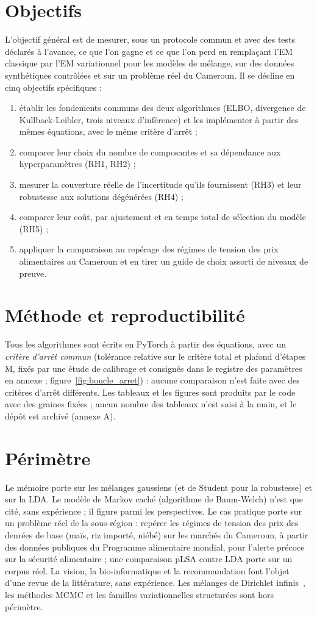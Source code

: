 \section*{Objectifs}
L'objectif général est de mesurer, sous un protocole commun et avec des tests déclarés à l'avance, ce que l'on gagne et ce que l'on perd en remplaçant l'EM classique par l'EM variationnel pour les modèles de mélange, sur des données synthétiques contrôlées et sur un problème réel du Cameroun. Il se décline en cinq objectifs spécifiques :
\begin{enumerate}
\item établir les fondements communs des deux algorithmes (ELBO, divergence de Kullback-Leibler, trois niveaux d'inférence) et les implémenter à partir des mêmes équations, avec le même critère d'arrêt ;
\item comparer leur choix du nombre de composantes et sa dépendance aux hyperparamètres (RH1, RH2) ;
\item mesurer la couverture réelle de l'incertitude qu'ils fournissent (RH3) et leur robustesse aux solutions dégénérées (RH4) ;
\item comparer leur coût, par ajustement et en temps total de sélection du modèle (RH5) ;
\item appliquer la comparaison au repérage des régimes de tension des prix alimentaires au Cameroun et en tirer un guide de choix assorti de niveaux de preuve.
\end{enumerate}

\section*{Méthode et reproductibilité}
Tous les algorithmes sont écrits en PyTorch à partir des équations, avec un \emph{critère d'arrêt commun} (tolérance relative sur le critère total et plafond d'étapes M, fixés par une étude de calibrage et consignés dans le registre des paramètres en annexe ; figure~\ref{fig:boucle_arret}) : aucune comparaison n'est faite avec des critères d'arrêt différents. Les tableaux et les figures sont produits par le code avec des graines fixées ; aucun nombre des tableaux n'est saisi à la main, et le dépôt est archivé (annexe A).

\section*{Périmètre}
Le mémoire porte sur les mélanges gaussiens (et de Student pour la robustesse) et sur la LDA. Le modèle de Markov caché (algorithme de Baum-Welch) n'est que cité, sans expérience ; il figure parmi les perspectives. Le cas pratique porte sur un problème réel de la sous-région : repérer les régimes de tension des prix des denrées de base (maïs, riz importé, niébé) sur les marchés du Cameroun, à partir des données publiques du Programme alimentaire mondial, pour l'alerte précoce sur la sécurité alimentaire ; une comparaison pLSA contre LDA porte sur un corpus réel. La vision, la bio-informatique et la recommandation font l'objet d'une revue de la littérature, sans expérience. Les mélanges de Dirichlet infinis~\cite{rasmussen2000,blei2006}, les méthodes MCMC et les familles variationnelles structurées sont hors périmètre.

